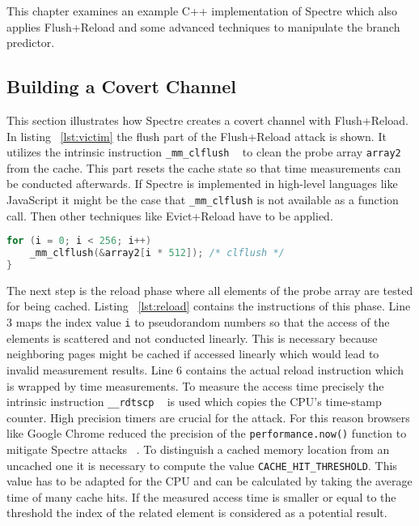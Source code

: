 \documentclass[a4paper,oneside,openright] {scrreprt}
\begin{document}
This chapter examines an example C++ implementation of Spectre which also applies Flush+Reload and some advanced techniques
to manipulate the branch predictor.

\subsection{Building a Covert Channel}
\label{ch:intro:motivation:A}
 
This section illustrates how Spectre creates a covert channel with Flush+Reload. 
In listing ~\ref{lst:victim} the flush part of the Flush+Reload attack is shown. It utilizes the intrinsic instruction 
\texttt{\_mm\_clflush} ~\cite{intelintrinsics} to clean the probe array \texttt{array2} from the cache. This part resets the cache state
so that time measurements can be conducted afterwards. If Spectre is implemented in high-level languages like JavaScript it
might be the case that \texttt{\_mm\_clflush} is not available as a function call. Then other techniques like Evict+Reload have
to be applied.

\begin{lstlisting}[language=C, caption=Spectre: Flush, label={lst:flush}]
for (i = 0; i < 256; i++)
    _mm_clflush(&array2[i * 512]); /* clflush */
}
\end{lstlisting}

The next step is the reload phase where all elements of the probe array are tested for being cached. 
Listing ~\ref{lst:reload} contains the instructions of this phase. Line 3 maps the index value \texttt{i} to pseudorandom numbers
 so that the access of the elements is scattered and not conducted linearly. 
 This is necessary because neighboring pages might be cached if 
accessed linearly which would lead to invalid measurement results. Line 6 contains the actual reload instruction which is wrapped 
by time measurements.
To measure the access time precisely the intrinsic instruction \texttt{\_\_rdtscp} ~\cite{intelintrinsics} is used which
copies the CPU's time-stamp counter. High precision timers are crucial for the attack. For this reason browsers like 
Google Chrome reduced the precision of the \texttt{performance.now()} function to mitigate Spectre attacks ~\cite{chromeSpectreMeltdown}.
To distinguish a cached memory location from an uncached one it is necessary to compute the value \texttt{CACHE\_HIT\_THRESHOLD}.
This value has to be adapted for the CPU and can be calculated by taking the average time of many cache hits.
If the measured access time is smaller or equal to the threshold the index of the related element is considered as a potential result.
\end{document}

